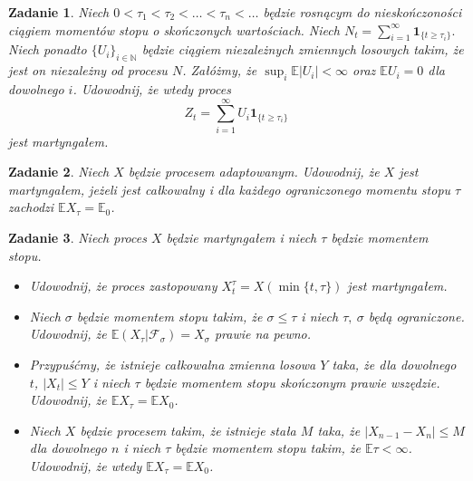 \documentclass{mwart}
\newtheorem{zd}{Zadanie}
\begin{document}
\begin{zd}
	Niech $0 < \tau_1 < \tau_2 < \dots < \tau_n < \dots $ będzie rosnącym do nieskończoności ciągiem momentów stopu o skończonych wartościach. Niech $N_t = \sum_{i = 1}^{\infty}\pmb{1}_{\{t \geq \tau_i\}}.$ Niech ponadto $\{U_i\}_{i \in \mathbb{N}}$ będzie ciągiem niezależnych zmiennych losowych takim, że jest on niezależny od procesu $N$. Załóżmy, że $\sup_i\mathbb{E}|U_i|< \infty$ oraz $\mathbb{E}U_i = 0$ dla dowolnego $i$. Udowodnij, że wtedy proces
	\begin{displaymath}
		Z_t = \sum_{i = 1}^{\infty}U_i\pmb{1}_{\{t \geq \tau_i\}}
	\end{displaymath}
	jest martyngałem.
\end{zd}

\begin{zd}
Niech $X$ będzie procesem adaptowanym. Udowodnij, że $X$ jest martyngałem, jeżeli jest całkowalny i dla każdego ograniczonego momentu stopu $\tau$ zachodzi $\mathbb{E}X_{\tau} = \mathbb{E}_0$.
\end{zd}

\begin{zd}
Niech proces $X$ będzie martyngałem i niech $\tau$ będzie momentem stopu.
\begin{itemize}
\item Udowodnij, że proces zastopowany $X^{\tau}_t = X(\min\{t, \tau\})$ jest martyngałem.
\item Niech $\sigma$ będzie momentem stopu takim, że $\sigma \leq \tau$ i niech $\tau,\ \sigma$ będą ograniczone. Udowodnij, że $\mathbb{E}\left(X_{\tau}|\mathcal{F}_{\sigma}\right) = X_{\sigma}$ prawie na pewno.
\item Przypuśćmy, że istnieje całkowalna zmienna losowa $Y$ taka, że dla dowolnego $t$, $|X_t| \leq Y$ i niech $\tau$ będzie momentem stopu skończonym prawie wszędzie. Udowodnij, że $\mathbb{E}X_{\tau} = \mathbb{E}X_0 $.
\item Niech $X$ będzie procesem takim, że istnieje stała $M$ taka, że $|X_{n-1} - X_n| \leq M$ dla dowolnego $n$ i niech $\tau$ będzie momentem stopu takim, że $\mathbb{E}\tau < \infty$. Udowodnij, że wtedy $\mathbb{E}X_{\tau} = \mathbb{E}X_0$.
\end{itemize}
\end{zd}
\end{document}
